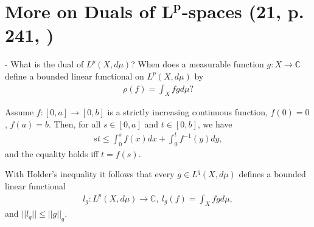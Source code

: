 \section{More on Duals of \(\boldsymbol{L^p}\)-spaces \tiny{(21, p. 241, \cite{schilling2017measures} )}}
- What is the dual of \(L^p(X,d\mu)\)? When does a measurable function \(g:X\rightarrow\mathbb{C}\) define a bounded linear functional on \(L^p(X,d\mu)\) by 
\begin{align*}
    \rho(f) = \int_X fgd\mu?
\end{align*}
\begin{theorem}
    Assume \(f:[0,a]\rightarrow[0,b]\) is a strictly increasing continuous function, \(f(0)=0\), \(f(a)=b\). Then, for all \(s\in[0,a]\) and \(t\in[0,b]\), we have 
    \begin{align*}
        st \leq \int_{0}^{s}f(x)dx + \int_{0}^{t}f^{-1}(y)dy,
    \end{align*}
    and the equality holds iff \(t= f(s)\).
\end{theorem}
With Holder's inequality it follows that every \(g\in L^q(X,d\mu)\) defines a bounded linear functional 
\begin{align*}
    l_g : L^p(X,d\mu) \rightarrow \mathbb{C}, \ l_g(f) = \int_X fgd\mu,
\end{align*}
and \(||l_q||\leq ||g||_q\).

